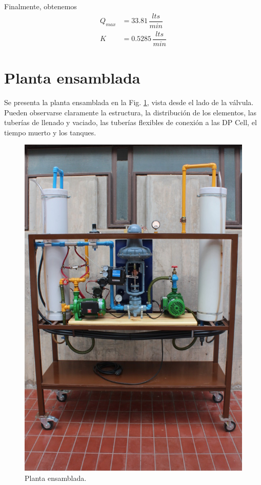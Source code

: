 Finalmente, obtenemos
\begin{align}
 Q_{max} &= 33.81\,\dfrac{lts}{min}
 \\
 K  &= 0.5285\,\dfrac{lts}{min}
\end{align}

\section{Planta ensamblada}
Se presenta la planta ensamblada en la Fig. \ref{fig:PlantaEnsamblada}, vista
desde el lado de la válvula.
Pueden observarse claramente la estructura, la distribución de los elementos,
las tuberías de llenado y vaciado, las tuberías flexibles de conexión a las DP
Cell, el tiempo muerto y los tanques.

\begin{figure}[ht]
	\centering
\includegraphics[width=.94\textwidth]{Cap2-DisenoEnsamblado/images/IMG_5123.JPG}
	\caption{Planta ensamblada.}
	\label{fig:PlantaEnsamblada}
\end{figure}

